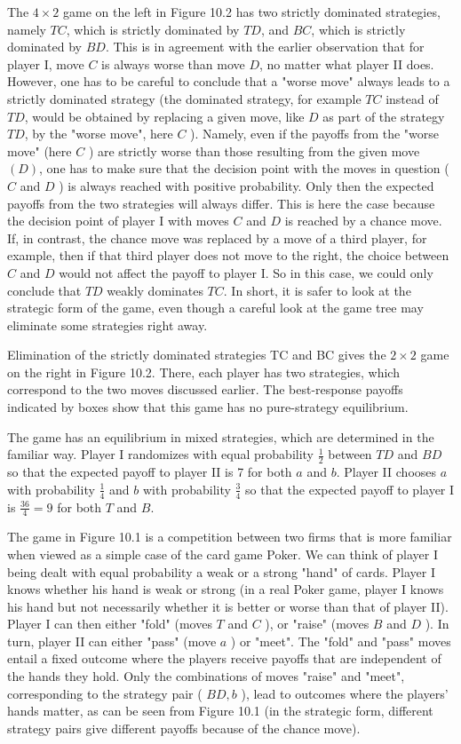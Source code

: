 \documentclass[12pt]{article}
\begin{document}
The $4 \times 2$ game on the left in Figure 10.2 has two strictly dominated strategies, namely $T C$, which is strictly dominated by $T D$, and $B C$, which is strictly dominated by $B D$. This is in agreement with the earlier observation that for player I, move $C$ is always worse than move $D$, no matter what player II does. However, one has to be careful to conclude that a "worse move" always leads to a strictly dominated strategy (the dominated strategy, for example $T C$ instead of $T D$, would be obtained by replacing a given move, like $D$ as part of the strategy $T D$, by the "worse move", here $C$ ). Namely, even if the payoffs from the "worse move" (here $C$ ) are strictly worse than those resulting from the given move $(D)$, one has to make sure that the decision point with the moves in question ( $C$ and $D$ ) is always reached with positive probability. Only then the expected payoffs from the two strategies will always differ. This is here the case because the decision point of player I with moves $C$ and $D$ is reached by a chance move. If, in contrast, the chance move was replaced by a move of a third player, for example, then if that third player does not move to the right, the choice between $C$ and $D$ would not affect the payoff to player I. So in this case, we could only conclude that $T D$ weakly dominates $T C$. In short, it is safer to look at the strategic form of the game, even though a careful look at the game tree may eliminate some strategies right away.

Elimination of the strictly dominated strategies TC and BC gives the $2 \times 2$ game on the right in Figure 10.2. There, each player has two strategies, which correspond to the two moves discussed earlier. The best-response payoffs indicated by boxes show that this game has no pure-strategy equilibrium.

The game has an equilibrium in mixed strategies, which are determined in the familiar way. Player I randomizes with equal probability $\frac{1}{2}$ between $T D$ and $B D$ so that the expected payoff to player II is 7 for both $a$ and $b$. Player II chooses $a$ with probability $\frac{1}{4}$ and $b$ with probability $\frac{3}{4}$ so that the expected payoff to player I is $\frac{36}{4}=9$ for both $T$ and $B$.

The game in Figure 10.1 is a competition between two firms that is more familiar when viewed as a simple case of the card game Poker. We can think of player I being dealt with equal probability a weak or a strong "hand" of cards. Player I knows whether his hand is weak or strong (in a real Poker game, player I knows his hand but not necessarily whether it is better or worse than that of player II). Player I can then either "fold" (moves $T$ and $C$ ), or "raise" (moves $B$ and $D$ ). In turn, player II can either "pass" (move $a$ ) or "meet". The "fold" and "pass" moves entail a fixed outcome where the players receive payoffs that are independent of the hands they hold. Only the combinations of moves "raise" and "meet", corresponding to the strategy pair ( $B D, b$ ), lead to outcomes where the players' hands matter, as can be seen from Figure 10.1 (in the strategic form, different strategy pairs give different payoffs because of the chance move).
\end{document}

